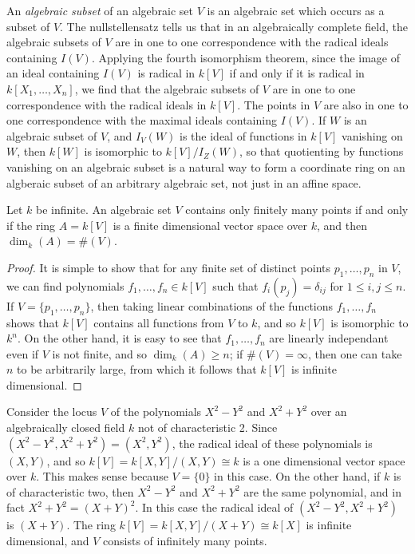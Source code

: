 An \emph{algebraic subset} of an algebraic set $V$ is an algebraic set which occurs as a subset of $V$. The nullstellensatz tells us that in an algebraically complete field, the algebraic subsets of $V$ are in one to one correspondence with the radical ideals containing $I(V)$. Applying the fourth isomorphism theorem, since the image of an ideal containing $I(V)$ is radical in $k[V]$ if and only if it is radical in $k[X_1,\dots,X_n]$, we find that the algebraic subsets of $V$ are in one to one correspondence with the radical ideals in $k[V]$. The points in $V$ are also in one to one correspondence with the maximal ideals containing $I(V)$. If $W$ is an algebraic subset of $V$, and $I_V(W)$ is the ideal of functions in $k[V]$ vanishing on $W$, then $k[W]$ is isomorphic to $k[V]/I_Z(W)$, so that quotienting by functions vanishing on an algebraic subset is a natural way to form a coordinate ring on an algberaic subset of an arbitrary algebraic set, not just in an affine space.

\begin{prop}
    Let $k$ be infinite. An algebraic set $V$ contains only finitely many points if and only if the ring $A = k[V]$ is a finite dimensional vector space over $k$, and then $\dim_k(A) = \#(V)$.
\end{prop}
\begin{proof}
    It is simple to show that for any finite set of distinct points $p_1,\dots,p_n$ in $V$, we can find polynomials $f_1,\dots,f_n \in k[V]$ such that $f_i(p_j) = \delta_{ij}$ for $1 \leq i,j \leq n$. If $V = \{ p_1,\dots,p_n \}$, then taking linear combinations of the functions $f_1,\dots,f_n$ shows that $k[V]$ contains all functions from $V$ to $k$, and so $k[V]$ is isomorphic to $k^n$. On the other hand, it is easy to see that $f_1,\dots,f_n$ are linearly independant even if $V$ is not finite, and so $\dim_k(A) \geq n$; if $\#(V) = \infty$, then one can take $n$ to be arbitrarily large, from which it follows that $k[V]$ is infinite dimensional.
\end{proof}

\begin{example}
    Consider the locus $V$ of the polynomials $X^2 - Y^2$ and $X^2 + Y^2$ over an algebraically closed field $k$ not of characteristic 2. Since $(X^2 - Y^2, X^2 + Y^2) = (X^2,Y^2)$, the radical ideal of these polynomials is $(X,Y)$, and so $k[V] = k[X,Y]/(X,Y) \cong k$ is a one dimensional vector space over $k$. This makes sense because $V = \{ 0 \}$ in this case.  On the other hand, if $k$ is of characteristic two, then $X^2 - Y^2$ and $X^2 + Y^2$ are the same polynomial, and in fact $X^2 + Y^2 = (X + Y)^2$. In this case the radical ideal of $(X^2 - Y^2, X^2 + Y^2)$ is $(X + Y)$. The ring $k[V] = k[X,Y]/(X+Y) \cong k[X]$ is infinite dimensional, and $V$ consists of infinitely many points.
\end{example}

